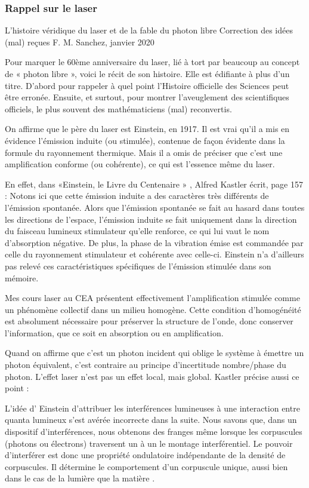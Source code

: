 \documentclass[a4paper,12pt]{article}
\begin{document}
\subsubsection{Rappel sur le laser}

L'histoire véridique du laser et de la fable du photon libre
Correction des idées (mal) reçues
F. M. Sanchez, janvier 2020

Pour marquer le 60ème anniversaire du laser, lié à tort par beaucoup au concept de « photon libre »,  voici le récit de son histoire. Elle est édifiante à plus d'un titre. D'abord pour rappeler à quel point l'Histoire officielle des Sciences peut être erronée. Ensuite, et surtout, pour montrer l'aveuglement des scientifiques officiels, le plus souvent des mathématiciens (mal) reconvertis.

On affirme que le père du laser est Einstein, en 1917. Il est vrai qu'il a mis en évidence l'émission induite (ou stimulée), contenue de façon évidente dans la formule du rayonnement thermique. Mais il a omis de préciser que c'est une amplification conforme (ou cohérente), ce qui est l'essence même du laser.

En effet, dans «Einstein, le Livre du Centenaire » \cite{French}, Alfred Kastler écrit, page 157 : Notons ici que cette émission induite a des caractères très différents de l'émission spontanée. Alors que l'émission spontanée se fait au hasard dans toutes les directions de l'espace, l'émission induite se fait uniquement dans la direction du faisceau lumineux stimulateur qu'elle renforce, ce qui lui vaut le nom d'absorption négative. De plus, la phase de la vibration émise est commandée par celle du rayonnement stimulateur et cohérente avec celle-ci. Einstein n'a d'ailleurs pas relevé ces caractéristiques spécifiques de l'émission stimulée dans son mémoire.

Mes cours laser au CEA présentent effectivement l'amplification stimulée comme un phénomène collectif dans un milieu homogène. Cette condition d'homogénéité est absolument nécessaire pour préserver la structure de l'onde, donc conserver l'information, que ce soit en absorption ou en amplification.

Quand on affirme que c'est un photon incident qui oblige le système à émettre un photon équivalent, c'est contraire au principe d'incertitude nombre/phase du photon. L'effet laser n'est pas un effet local, mais global. Kastler précise aussi ce point :

L'idée d' Einstein d'attribuer les interférences lumineuses à une interaction entre quanta lumineux s'est avérée incorrecte dans la suite. Nous savons que, dans un dispositif d'interférences, nous obtenons des franges même lorsque les corpuscules (photons ou électrons) traversent un à un le montage interférentiel. Le pouvoir d'interférer est donc une propriété ondulatoire indépendante de la densité de corpuscules. Il détermine le comportement d'un corpuscule unique, aussi bien dans le cas de la lumière que la matière .
\end{document}
